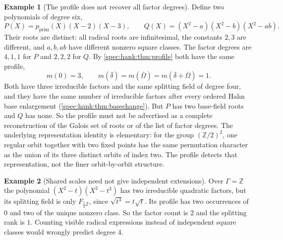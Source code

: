 \documentclass[11pt,a4paper]{article}
\numberwithin{equation}{section}
\theoremstyle{definition}
\newtheorem{example}[example]{Example}
\theoremstyle{remark}
\newcommand{\Z}{\mathbb Z}
\begin{document}
\begin{example}[The profile does not recover all factor degrees]\label{spec:hank:ex:ambiguity}
Define two polynomials of degree six,
\[
 P(X)=p_{\mathrm{prim}}(X)(X-2)(X-3),\qquad
 Q(X)=(X^2-a)(X^2-b)(X^2-ab).
\]
Their roots are distinct: all radical roots are infinitesimal, the constants
$2,3$ are different, and $a,b,ab$ have different nonzero square classes. The
factor degrees are $4,1,1$ for $P$ and $2,2,2$ for $Q$. By
\cref{spec:hank:thm:profile} both have the same profile,
\[
 m(0)=3,\qquad
 m(\bar\delta)=m(\bar\Omega)=m(\bar\delta+\bar\Omega)=1.
\]
Both have three irreducible factors and the same splitting field of degree
four, and they have the same number of irreducible factors after every
ordered Hahn base enlargement (\cref{spec:hank:thm:basechange}). But $P$ has
two base-field roots and $Q$ has none. So the profile must not be advertised
as a complete reconstruction of the Galois set of roots or of the list of
factor degrees. The underlying representation identity is elementary: for
the group $(\Z/2)^2$, one regular orbit together with two fixed points has
the same permutation character as the union of its three distinct orbits of
index two. The profile detects that representation, not the finer
orbit-by-orbit structure.
\end{example}

\begin{example}[Shared scales need not give independent extensions]\label{spec:hank:ex:shared}
Over $\Gamma=\Z$ the polynomial $(X^2-t)(X^2-t^3)$ has two irreducible
quadratic factors, but its splitting field is only $F_{\frac12\Z}$, since
$\sqrt{t^3}=t\sqrt t$. Its profile has two occurrences of $0$ and two of the
unique nonzero class. So the factor count is $2$ and the splitting rank is
$1$. Counting visible radical expressions instead of independent square
classes would wrongly predict degree $4$.
\end{example}
\end{document}
